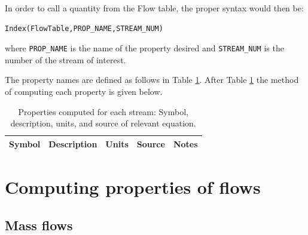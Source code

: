 \documentclass[11pt]{report}
\begin{document}
In order to call a quantity from the Flow table, the proper syntax would then be:
\begin{verbatim}
Index(FlowTable,PROP_NAME,STREAM_NUM)
\end{verbatim}
where \verb+PROP_NAME+ is the name of the property desired and \verb+STREAM_NUM+ is the number of the stream of interest.

The property names are defined as follows in Table \ref{tab:stream_properties}. After Table \ref{tab:stream_properties} the method of computing each property is given below.

\begin{table}
\begin{scriptsize}
\caption{Properties computed for each stream: Symbol, description, units, and source of relevant equation.}
\label{tab:stream_properties}
\begin{tabularx}{1\columnwidth}{p{}p{}p{}p{}p{}}
\toprule
Symbol 		&	Description		& Units		& Source		& Notes \\
\midrule
\bottomrule
\end{tabularx}
\end{scriptsize}
\end{table}



\section{Computing properties of flows}

\subsection{Mass flows}
\end{document}
